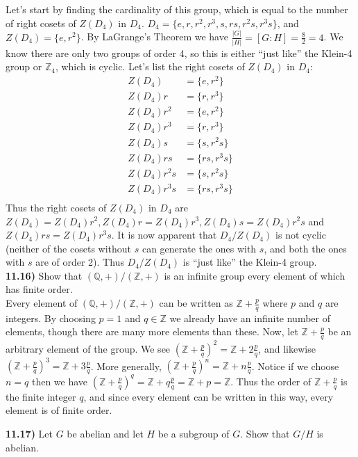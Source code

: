 \documentclass{scrartcl}
\begin{document}
Let's start by finding the cardinality of this group, which is equal to the number of right cosets of $Z(D_4)$ in $D_4$. $D_4=\{e,r,r^2,r^3,s,rs,r^2s,r^3s\}$, and $Z(D_4)=\{e,r^2\}$. By LaGrange's Theorem we have $\frac{|G|}{|H|}=[G:H]=\frac{8}{2}=4$. We know there are only two groups of order 4, so this is either ``just like'' the Klein-4 group or $\mathbb{Z}_4$, which is cyclic. Let's list the right cosets of $Z(D_4)$ in $D_4$:
\begin{align*}
Z(D_4)&=\{e,r^2\}\\
Z(D_4)r&=\{r,r^3\}\\
Z(D_4)r^2&=\{e,r^2\}\\
Z(D_4)r^3&=\{r,r^3\}\\
Z(D_4)s&=\{s,r^2s\}\\
Z(D_4)rs&=\{rs,r^3s\}\\
Z(D_4)r^2s&=\{s,r^2s\}\\
Z(D_4)r^3s&=\{rs,r^3s\}\\
\end{align*}
Thus the right cosets of $Z(D_4)$ in $D_4$ are $Z(D_4)=Z(D_4)r^2, Z(D_4)r=Z(D_4)r^3, Z(D_4)s=Z(D_4)r^2s$ and $Z(D_4)rs=Z(D_4)r^3s$. It is now apparent that $D_4/Z(D_4)$ is not cyclic (neither of the cosets without $s$ can generate the ones with $s$, and both the ones with $s$ are of order 2). Thus $D_4/Z(D_4)$ is ``just like'' the Klein-4 group.\\

\textbf{11.16)} Show that $(\mathbb{Q},+)/(\mathbb{Z},+)$ is an infinite group every element of which has finite order.\\

Every element of $(\mathbb{Q},+)/(\mathbb{Z},+)$ can be written as $\mathbb{Z}+\frac{p}{q}$ where $p$ and $q$ are integers. By choosing $p=1$ and $q \in \mathbb{Z}$ we already have an infinite number of elements, though there are many more elements than these. Now, let $\mathbb{Z}+\frac{p}{q}$ be an arbitrary element of the group. We see $(\mathbb{Z}+\frac{p}{q})^2=\mathbb{Z}+2\frac{p}{q}$, and likewise $(\mathbb{Z}+\frac{p}{q})^3=\mathbb{Z}+3\frac{p}{q}$. More generally, $(\mathbb{Z}+\frac{p}{q})^n=\mathbb{Z}+n\frac{p}{q}$. Notice if we choose $n=q$ then we have $(\mathbb{Z}+\frac{p}{q})^q=\mathbb{Z}+q\frac{p}{q}=\mathbb{Z}+p=\mathbb{Z}$. Thus the order of $\mathbb{Z}+\frac{p}{q}$ is the finite integer $q$, and since every element can be written in this way, every element is of finite order.\pagebreak

\textbf{11.17)} Let $G$ be abelian and let $H$ be a subgroup of $G$. Show that $G/H$ is abelian.\\
\end{document}
